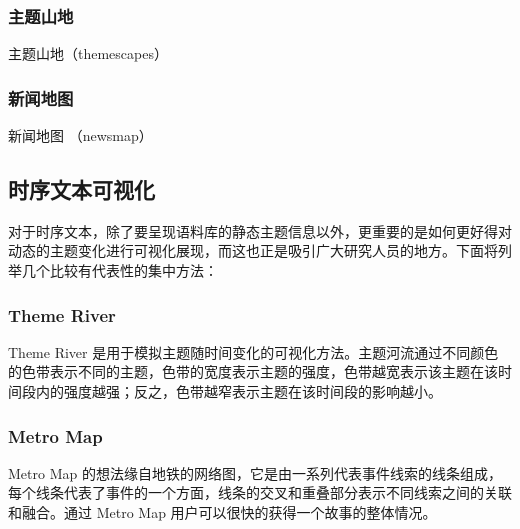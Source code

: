 \subsubsection{主题山地}
主题山地（themescapes）

\subsubsection{新闻地图}
新闻地图 （newsmap）

\subsection{时序文本可视化}
对于时序文本，除了要呈现语料库的静态主题信息以外，更重要的是如何更好得对动态的主题变化进行可视化展现，而这也正是吸引广大研究人员的地方。下面将列举几个比较有代表性的集中方法：
\subsubsection{Theme River}
Theme River \cite{Havre:2000}是用于模拟主题随时间变化的可视化方法。主题河流通过不同颜色的色带表示不同的主题，色带的宽度表示主题的强度，色带越宽表示该主题在该时间段内的强度越强；反之，色带越窄表示主题在该时间段的影响越小。

\subsubsection{Metro Map}
Metro Map \cite{shahaf2012trains} 的想法缘自地铁的网络图，它是由一系列代表事件线索的线条组成，每个线条代表了事件的一个方面，线条的交叉和重叠部分表示不同线索之间的关联和融合。通过 Metro Map 用户可以很快的获得一个故事的整体情况。
